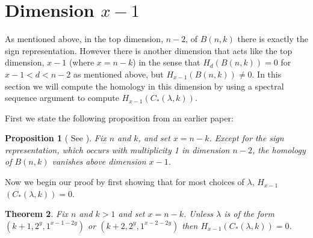 \documentclass{elsart}
\newtheorem{theorem}{Theorem}[section]
\newtheorem{proposition}[theorem]{Proposition}
\begin{document}
\section{Dimension $x-1$} \label{S:x-1}

As mentioned above, in the top dimension, $n-2$, of $B(n, k)$ there is exactly the sign representation. However there is
another dimension that acts like the top dimension, $x-1$ (where $x=n-k$) in the sense that $H_d(B(n, k)) = 0 $ for 
$ x-1 < d < n-2$ as mentioned above, but $H_{x-1}(B(n, k)) \ne 0$. In this section we will compute the homology in this 
dimension by using a spectral sequence argument to compute $H_{x-1}(C_*(\lambda, k))$.

First we state the following proposition from an earlier paper:

\begin{proposition}[ See \cite{S1}] \label{P:uppertri} Fix $n$ and $k$, and set $x=n-k$. 
  Except for the sign representation, which occurs with multiplicity 1 in
  dimension $n-2$, the homology of $B(n, k)$ vanishes above dimension $x-1$. 
\end{proposition}

Now we begin our proof by first showing that for most choices of $\lambda$, $H_{x-1}$ $(C_*(\lambda, k)) = 0$. 

\begin{theorem}\label{T:topdim} Fix $n$ and $k > 1$ and set $x=n-k$. Unless $\lambda$ is of the form $(k+1, 2^y, 1^{x-1-2y})$ or 
$(k+2, 2^y, 1^{x-2-2y})$ then $H_{x-1}(C_*(\lambda, k))=0$. 
\end{theorem}
\end{document}
